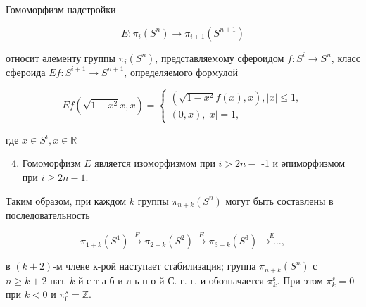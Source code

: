 \documentclass[10pt]{article}
\begin{document}
Гомоморфизм надстройки



\[

E: \pi_{i}\left(S^{n}\right) \longrightarrow \pi_{i+1}\left(S^{n+1}\right)

\]



относит әлементу группы $\pi_{i}\left(S^{n}\right)$, представляемому сфероидом $f: S^{i} \rightarrow S^{n}$, класс сфероида $E f: S^{i+1} \rightarrow S^{n+1}$, определяемого формулой



\[

E f\left(\sqrt{1-x^{2}} x, x\right)=\left\{\begin{array}{l}

\left(\sqrt{1-x^{2}} f(x), x\right),|x| \leqslant 1, \\

(0, x),|x|=1,

\end{array}\right.

\]



где $x \in S^{i}, x \in \mathbb{R}$



\begin{enumerate}

  \setcounter{enumi}{3}

  \item Гомоморфизм $E$ является изоморфизмом при $i>2 n-$ -1 и әпиморфизмом при $i \geqslant 2 n-1$.

\end{enumerate}



Таким образом, при каждом $k$ группы $\pi_{n+k}\left(S^{n}\right)$ могут быть составлены в последовательность



\[

\pi_{1+k}\left(S^{1}\right) \stackrel{E}{\longrightarrow} \pi_{2+k}\left(S^{2}\right) \stackrel{E}{\longrightarrow} \pi_{3+k}\left(S^{3}\right) \stackrel{E}{\longrightarrow \ldots,}

\]



в $(k+2)$-м члене к-рой наступает стабилизация; группа $\pi_{n+k}\left(S^{n}\right)$ с $n \geqslant k+2$ наз. $k$-й с т а б и л ь н о й С. г. г. и обозначается $\pi_{k}^{\mathrm{s}}$. При этом $\pi_{k}^{s}=0$ при $k<0$ и $\pi_{0}^{s}=\mathbb{Z}$.
\end{document}
